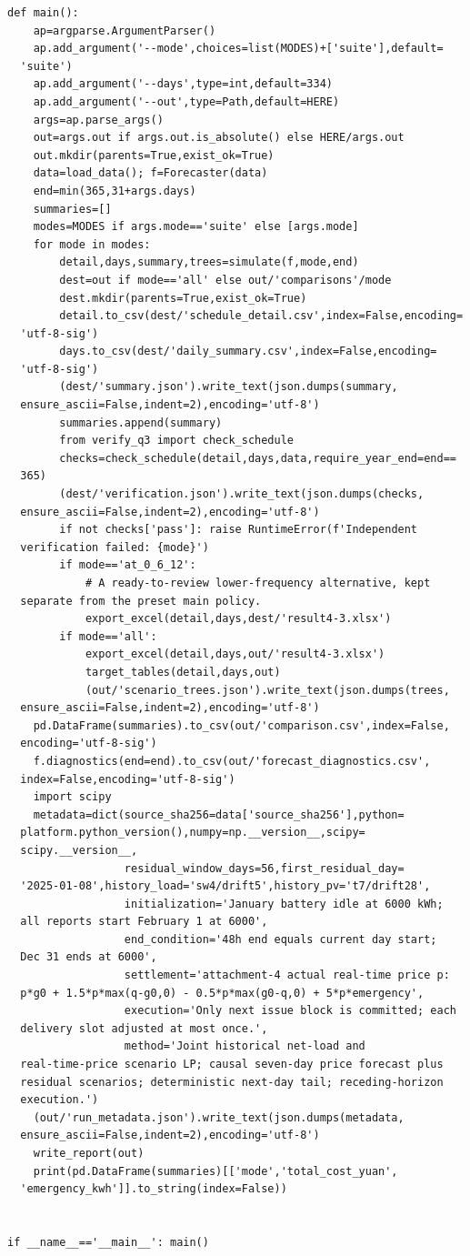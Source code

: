 \begin{verbatim}
def main():
    ap=argparse.ArgumentParser()
    ap.add_argument('--mode',choices=list(MODES)+['suite'],default=
  'suite')
    ap.add_argument('--days',type=int,default=334)
    ap.add_argument('--out',type=Path,default=HERE)
    args=ap.parse_args()
    out=args.out if args.out.is_absolute() else HERE/args.out
    out.mkdir(parents=True,exist_ok=True)
    data=load_data(); f=Forecaster(data)
    end=min(365,31+args.days)
    summaries=[]
    modes=MODES if args.mode=='suite' else [args.mode]
    for mode in modes:
        detail,days,summary,trees=simulate(f,mode,end)
        dest=out if mode=='all' else out/'comparisons'/mode
        dest.mkdir(parents=True,exist_ok=True)
        detail.to_csv(dest/'schedule_detail.csv',index=False,encoding=
  'utf-8-sig')
        days.to_csv(dest/'daily_summary.csv',index=False,encoding=
  'utf-8-sig')
        (dest/'summary.json').write_text(json.dumps(summary,
  ensure_ascii=False,indent=2),encoding='utf-8')
        summaries.append(summary)
        from verify_q3 import check_schedule
        checks=check_schedule(detail,days,data,require_year_end=end==
  365)
        (dest/'verification.json').write_text(json.dumps(checks,
  ensure_ascii=False,indent=2),encoding='utf-8')
        if not checks['pass']: raise RuntimeError(f'Independent
  verification failed: {mode}')
        if mode=='at_0_6_12':
            # A ready-to-review lower-frequency alternative, kept
  separate from the preset main policy.
            export_excel(detail,days,dest/'result4-3.xlsx')
        if mode=='all':
            export_excel(detail,days,out/'result4-3.xlsx')
            target_tables(detail,days,out)
            (out/'scenario_trees.json').write_text(json.dumps(trees,
  ensure_ascii=False,indent=2),encoding='utf-8')
    pd.DataFrame(summaries).to_csv(out/'comparison.csv',index=False,
  encoding='utf-8-sig')
    f.diagnostics(end=end).to_csv(out/'forecast_diagnostics.csv',
  index=False,encoding='utf-8-sig')
    import scipy
    metadata=dict(source_sha256=data['source_sha256'],python=
  platform.python_version(),numpy=np.__version__,scipy=
  scipy.__version__,
                  residual_window_days=56,first_residual_day=
  '2025-01-08',history_load='sw4/drift5',history_pv='t7/drift28',
                  initialization='January battery idle at 6000 kWh;
  all reports start February 1 at 6000',
                  end_condition='48h end equals current day start;
  Dec 31 ends at 6000',
                  settlement='attachment-4 actual real-time price p:
  p*g0 + 1.5*p*max(q-g0,0) - 0.5*p*max(g0-q,0) + 5*p*emergency',
                  execution='Only next issue block is committed; each
  delivery slot adjusted at most once.',
                  method='Joint historical net-load and
  real-time-price scenario LP; causal seven-day price forecast plus
  residual scenarios; deterministic next-day tail; receding-horizon
  execution.')
    (out/'run_metadata.json').write_text(json.dumps(metadata,
  ensure_ascii=False,indent=2),encoding='utf-8')
    write_report(out)
    print(pd.DataFrame(summaries)[['mode','total_cost_yuan',
  'emergency_kwh']].to_string(index=False))


if __name__=='__main__': main()
\end{verbatim}

